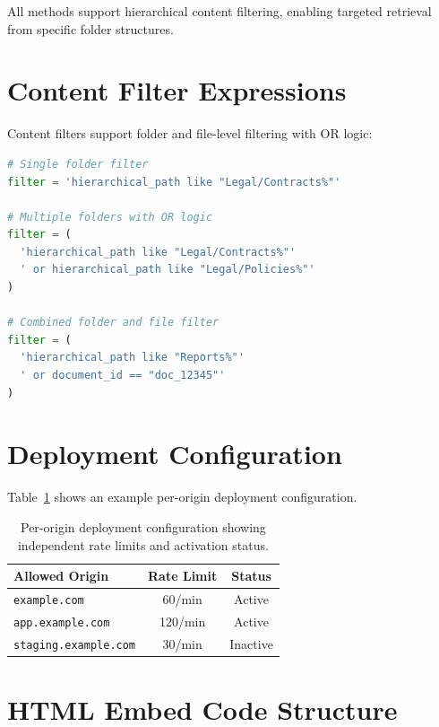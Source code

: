 \documentclass[11pt]{article}
\begin{document}
All methods support hierarchical content filtering, enabling targeted retrieval from specific folder structures.


\section{Content Filter Expressions}
\label{app:content-filter}

Content filters support folder and file-level filtering with OR logic:

\begin{lstlisting}[language=Python,caption={Content filter expression examples}]
# Single folder filter
filter = 'hierarchical_path like "Legal/Contracts%"'

# Multiple folders with OR logic
filter = (
  'hierarchical_path like "Legal/Contracts%"'
  ' or hierarchical_path like "Legal/Policies%"'
)

# Combined folder and file filter
filter = (
  'hierarchical_path like "Reports%"'
  ' or document_id == "doc_12345"'
)
\end{lstlisting}


\section{Deployment Configuration}
\label{app:deployment-config}

Table~\ref{tab:deployment-origins} shows an example per-origin deployment configuration.

\begin{table}[h]
\centering
\small
\begin{tabular}{lcc}
\toprule
\textbf{Allowed Origin} & \textbf{Rate Limit} & \textbf{Status} \\
\midrule
\texttt{example.com} & 60/min & Active \\
\texttt{app.example.com} & 120/min & Active \\
\texttt{staging.example.com} & 30/min & Inactive \\
\bottomrule
\end{tabular}
\caption{Per-origin deployment configuration showing independent rate limits and activation status.}
\label{tab:deployment-origins}
\end{table}


\section{HTML Embed Code Structure}
\label{app:embed-code}
\end{document}
